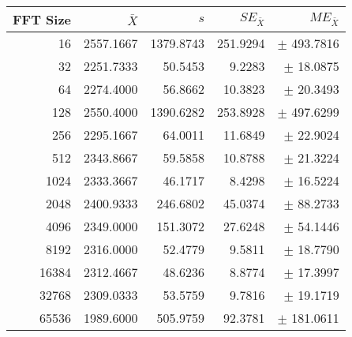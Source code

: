 \begin{tabular}{|r|r|r|r|r|}\hline
    FFT Size & $\bar{X}$ & $s$ & $SE_{\bar{X}}$ & $ME_{\bar{X}}$ \\ \hline
    16 & 2557.1667 & 1379.8743 & 251.9294 & $\pm$ 493.7816 \\ \hline
    32 & 2251.7333 & 50.5453 & 9.2283 & $\pm$ 18.0875 \\ \hline
    64 & 2274.4000 & 56.8662 & 10.3823 & $\pm$ 20.3493 \\ \hline
    128 & 2550.4000 & 1390.6282 & 253.8928 & $\pm$ 497.6299 \\ \hline
    256 & 2295.1667 & 64.0011 & 11.6849 & $\pm$ 22.9024 \\ \hline
    512 & 2343.8667 & 59.5858 & 10.8788 & $\pm$ 21.3224 \\ \hline
    1024 & 2333.3667 & 46.1717 & 8.4298 & $\pm$ 16.5224 \\ \hline
    2048 & 2400.9333 & 246.6802 & 45.0374 & $\pm$ 88.2733 \\ \hline
    4096 & 2349.0000 & 151.3072 & 27.6248 & $\pm$ 54.1446 \\ \hline
    8192 & 2316.0000 & 52.4779 & 9.5811 & $\pm$ 18.7790 \\ \hline
    16384 & 2312.4667 & 48.6236 & 8.8774 & $\pm$ 17.3997 \\ \hline
    32768 & 2309.0333 & 53.5759 & 9.7816 & $\pm$ 19.1719 \\ \hline
    65536 & 1989.6000 & 505.9759 & 92.3781 & $\pm$ 181.0611 \\ \hline
\end{tabular}
